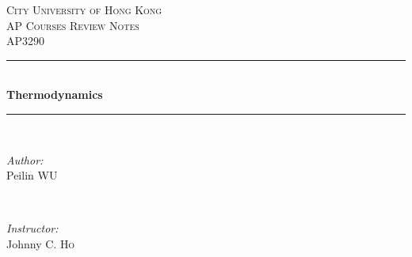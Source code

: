 \documentclass[UTF8]{book}
\date{\today}
\begin{document}
\frontmatter

\begin{titlepage}
\newcommand{\HRule}{\rule{\linewidth}{0.5mm}} %

\center %


\textsc{\LARGE City University of Hong Kong}\\[1.5cm] %
\textsc{\Large AP Courses Review Notes}\\[0.5cm] 		%
\textsc{\large {AP3290}}\\[0.5cm] 						%


\HRule \\[0.4cm]
{ \huge \bfseries  \textsf{Thermodynamics} }\\[0.4cm] %
\HRule \\[1.5cm]


\begin{minipage}{0.4\textwidth}
\begin{flushleft} \large
\emph{Author:}\\
Peilin \textsc{WU} %
\end{flushleft}
\end{minipage}%
~\begin{minipage}{0.4\textwidth}
\begin{flushright} \large
\emph{Instructor:} \\
Johnny C. \textsc{Ho} %
\end{flushright}
\end{minipage}\\[2cm]


\end{titlepage}
\end{document}
